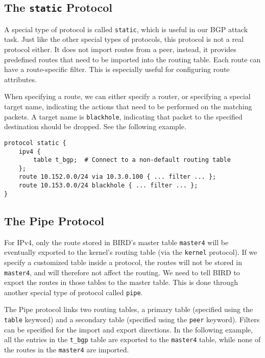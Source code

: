 \subsection{The \texttt{static} Protocol} 

A special type of protocol is called \texttt{static}, which is 
useful in our BGP attack task. Just like the other special
types of protocols, this protocol is not a real protocol either.
It does not import routes from a peer, instead, it provides 
predefined routes that need to be imported into 
the routing table. Each route can have a route-specific
filter. This is especially useful for configuring route attributes. 

When specifying a route, we can either specify a router, or 
specifying a special target name, indicating the actions 
that need to be performed on the matching packets. 
A target name is \texttt{blackhole},
indicating that packet to the specified destination should be 
dropped. See the following example.

\begin{lstlisting}
protocol static {
    ipv4 {
        table t_bgp;  # Connect to a non-default routing table
    };
    route 10.152.0.0/24 via 10.3.0.100 { ... filter ... };
    route 10.153.0.0/24 blackhole { ... filter ... };
}
\end{lstlisting}



\subsection{The Pipe Protocol} 

For IPv4, only the route stored in BIRD's master table \texttt{master4} will be eventually
exported to the kernel's routing table (via the \texttt{kernel} protocol). 
If we specify a customized table
inside a protocol, the routes will not be stored in \texttt{master4},
and will therefore not affect the routing. We need to tell BIRD
to export the routes in those tables to the master table. This is done 
through another special type of protocol called \texttt{pipe}. 

The Pipe protocol links two routing tables, a primary table (specified using
the \texttt{table} keyword) and a secondary table (specified using 
the \texttt{peer} keyword). Filters can be specified for the import
and export directions. In the following example, all the entries
in the \texttt{t\_bgp} table are exported to the \texttt{master4} table,
while none of the routes in the \texttt{master4} are imported. 


